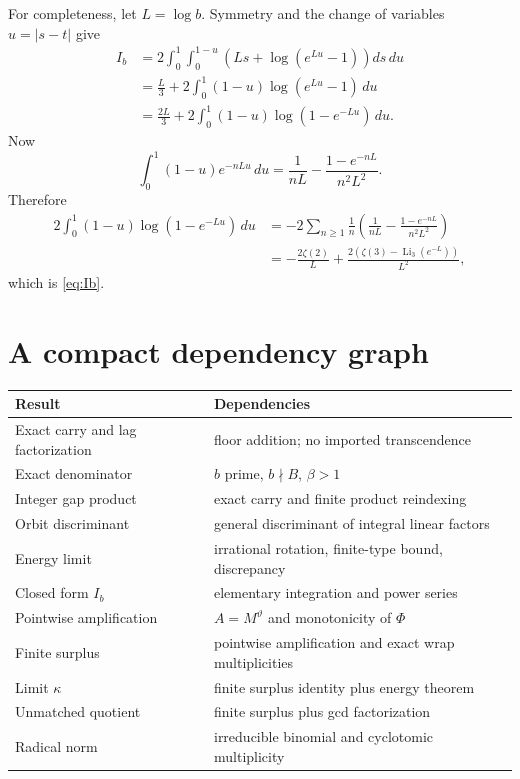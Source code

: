 \documentclass[11pt,oneside]{article}
\theoremstyle{definition}
\theoremstyle{remark}
\newcommand{\Li}{\operatorname{Li}}
\newcommand{\thetaq}{\vartheta}
\begin{document}
For completeness, let $L=\log b$.  Symmetry and the change of variables $u=|s-t|$ give
\begin{align*}
 I_b
 &=2\int_0^1\int_0^{1-u}
 \left(Ls+\log(e^{Lu}-1)\right)ds\,du\\
 &=\frac{L}{3}+2\int_0^1(1-u)\log(e^{Lu}-1)\,du\\
 &=\frac{2L}{3}+2\int_0^1(1-u)\log(1-e^{-Lu})\,du.
\end{align*}
Now
\[
 \int_0^1(1-u)e^{-nLu}\,du
 =\frac1{nL}-\frac{1-e^{-nL}}{n^2L^2}.
\]
Therefore
\begin{align*}
 2\int_0^1(1-u)\log(1-e^{-Lu})\,du
 &=-2\sum_{n\ge1}\frac1n
 \left(\frac1{nL}-\frac{1-e^{-nL}}{n^2L^2}\right)\\
 &=-\frac{2\zeta(2)}L
 +\frac{2(\zeta(3)-\Li_3(e^{-L}))}{L^2},
\end{align*}
which is \eqref{eq:Ib}.

\section{A compact dependency graph}
\label{app:dependencies}

\begin{center}
\begin{tabularx}{0.98\textwidth}{>{\raggedright\arraybackslash}p{} >{\raggedright\arraybackslash}X}
\toprule
Result & Dependencies \\
\midrule
Exact carry and lag factorization & floor addition; no imported transcendence \\
Exact denominator & $b$ prime, $b\nmid B$, $\beta>1$ \\
Integer gap product & exact carry and finite product reindexing \\
Orbit discriminant & general discriminant of integral linear factors \\
Energy limit & irrational rotation, finite-type bound, discrepancy \\
Closed form $I_b$ & elementary integration and power series \\
Pointwise amplification & $A=M^{\thetaq}$ and monotonicity of $\Phi$ \\
Finite surplus & pointwise amplification and exact wrap multiplicities \\
Limit $\kappa$ & finite surplus identity plus energy theorem \\
Unmatched quotient & finite surplus plus gcd factorization \\
Radical norm & irreducible binomial and cyclotomic multiplicity \\
\bottomrule
\end{tabularx}
\end{center}
\end{document}
